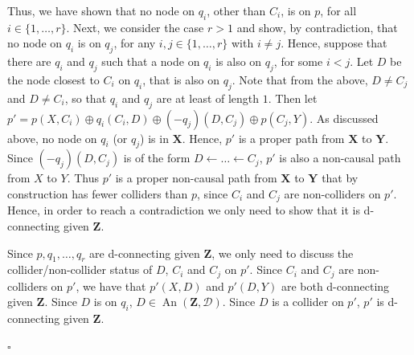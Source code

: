 \documentclass[11pt,a4paper]{article}
\newenvironment{proofof}[1][]{\begin{trivlist}
   \item[\hskip \labelsep {\bfseries Proof of #1.}]}{\hfill{}$\square$\end{trivlist}}
\DeclareMathOperator{\An}{An}
\newcommand{\g}[1][G]{\mathcal{#1}}
\begin{document}
\begin{proofof}[Theorem~\ref{theorem:completeness ac}]
\begin{enumerate}[label=(\roman*)]
{Thus, we have shown that no node on $q_i$, other than $C_i$, is on $p$, for all $i \in \{1,\dots,r\}$. Next, we consider the case $r>1$ and show, by contradiction, that no node on $q_i$ is on $q_j$, for any $i,j \in \{ 1,\dots, r\}$ with $i \neq j$.
Hence, suppose that there are $q_i$ and $q_j$ such that a node on $q_i$ is also on $q_j$, for some $i <j$. Let $D$ be the node closest to $C_i$ on $q_i$, that is also on $q_j$. Note that from the above, $D \neq C_j$ and $D \neq C_i$, so that $q_i$ and $q_j$ are at least of length $1$. Then let $p' = p(X,C_i) \oplus q_i(C_i,D) \oplus (-q_j)(D,C_j) \oplus p(C_j,Y)$. As discussed above, no node on $q_i$ (or $q_j$) is in $\mathbf{X}$. Hence, $p'$ is a proper path from $\mathbf{X}$ to $\mathbf{Y}$. Since $ (-q_j)(D,C_j) $ is of the form $D \leftarrow \dots \leftarrow C_j$, $p'$ is also a non-causal path from $X$ to $Y$. Thus $p'$ is a proper non-causal path from $\mathbf{X}$ to $\mathbf{Y}$ that by construction has fewer colliders than $p$, since $C_i$ and $C_j$ are non-colliders on $p'$. Hence, in order to reach a contradiction we only need to show that it is d-connecting given $\mathbf{Z}$.

Since $p,q_1,\dots,q_r$ are d-connecting given $\mathbf{Z}$, we only need to discuss the collider/non-collider status of $D$, $C_i$ and $C_j$ on $p'$. Since $C_i$ and $C_j$ are non-colliders on $p'$, we have that $p'(X,D)$ and $p'(D,Y)$ are both d-connecting given $\mathbf{Z}$. Since $D$ is on $q_i$, $D \in \An(\mathbf{Z},\g[D])$. Since $D$ is a collider on $p'$, $p'$ is d-connecting given $\mathbf{Z}$.

}
\end{enumerate}
\end{proofof}
\end{document}
